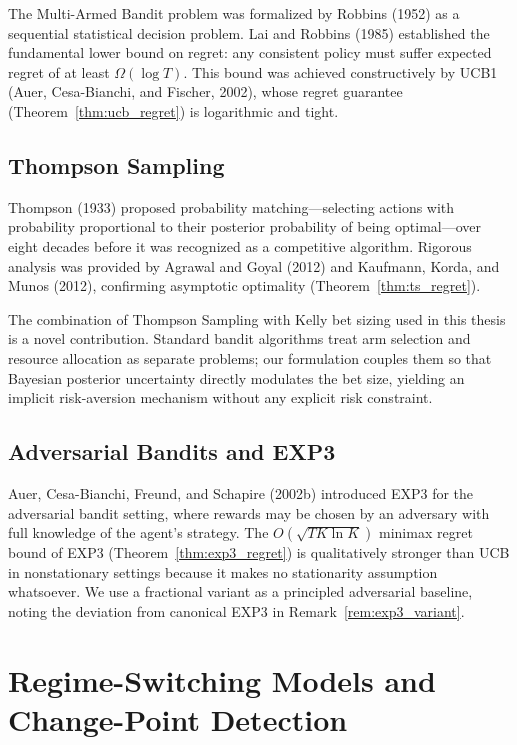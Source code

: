 The Multi-Armed Bandit problem was formalized by Robbins (1952) as a
sequential statistical decision problem.  Lai and Robbins (1985) established
the fundamental lower bound on regret: any consistent policy must suffer
expected regret of at least $\Omega(\log T)$.  This bound was achieved
constructively by UCB1 (Auer, Cesa-Bianchi, and Fischer, 2002), whose regret
guarantee (Theorem~\ref{thm:ucb_regret}) is logarithmic and tight.

\subsection{Thompson Sampling}

Thompson (1933) proposed probability matching---selecting actions with
probability proportional to their posterior probability of being optimal---over
eight decades before it was recognized as a competitive algorithm.  Rigorous
analysis was provided by Agrawal and Goyal (2012) and Kaufmann, Korda, and
Munos (2012), confirming asymptotic optimality (Theorem~\ref{thm:ts_regret}).

The combination of Thompson Sampling with Kelly bet sizing used in this thesis
is a novel contribution.  Standard bandit algorithms treat arm selection and
resource allocation as separate problems; our formulation couples them so that
Bayesian posterior uncertainty directly modulates the bet size, yielding an
implicit risk-aversion mechanism without any explicit risk constraint.

\subsection{Adversarial Bandits and EXP3}

Auer, Cesa-Bianchi, Freund, and Schapire (2002b) introduced EXP3 for the
adversarial bandit setting, where rewards may be chosen by an adversary with
full knowledge of the agent's strategy.  The $O(\sqrt{T K \ln K})$ minimax
regret bound of EXP3 (Theorem~\ref{thm:exp3_regret}) is qualitatively stronger
than UCB in nonstationary settings because it makes no stationarity assumption
whatsoever.  We use a fractional variant as a principled adversarial baseline,
noting the deviation from canonical EXP3 in Remark~\ref{rem:exp3_variant}.

\section{Regime-Switching Models and Change-Point Detection}

